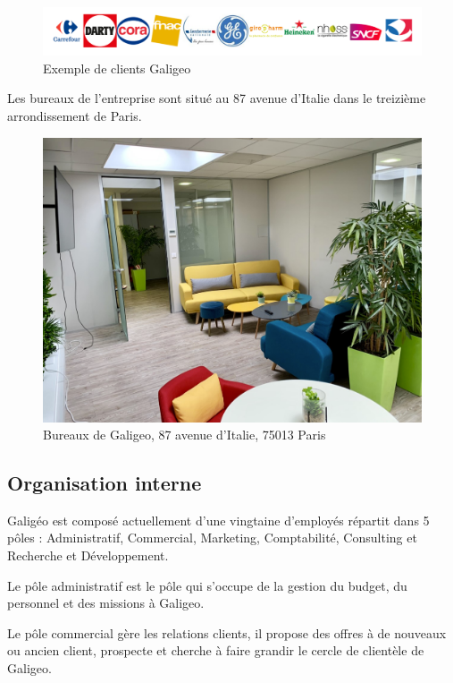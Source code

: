 \begin{figure}[H]
    \centering
    \includegraphics[width=\linewidth]{images/logos/client.png}
    \caption{Exemple de clients Galigeo}
    \label{fig:clients}
\end{figure}

Les bureaux de l'entreprise sont situé au 87 avenue d'Italie dans le treizième arrondissement de Paris.

\begin{figure}[H]
    \centering
    \includegraphics[width=12cm]{images/photos/bureaux_galigeo.png}
    \caption{Bureaux de Galigeo, 87 avenue d'Italie, 75013 Paris}
    \label{fig:offices}
\end{figure}


\subsection{Organisation interne}

Galigéo est composé actuellement d’une vingtaine d’employés répartit dans 5 pôles : Administratif, Commercial, Marketing, Comptabilité, Consulting et Recherche et Développement.

Le pôle administratif est le pôle qui s’occupe de la gestion du budget, du personnel et des missions à Galigeo.

Le pôle commercial gère les relations clients, il propose des offres à de nouveaux ou ancien client, prospecte et cherche à faire grandir le cercle de clientèle de Galigeo.

